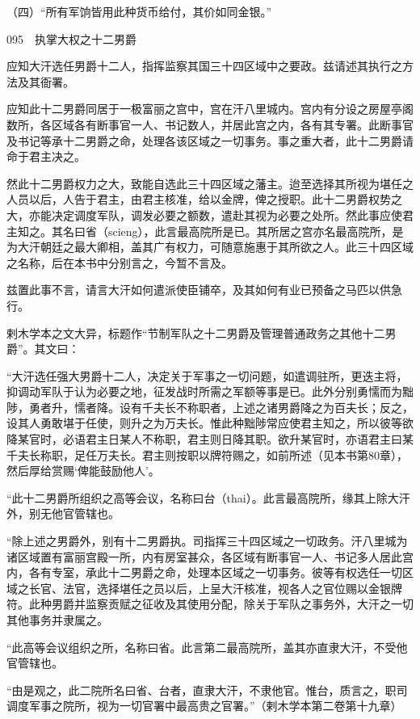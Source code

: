 \documentclass[12pt,UTF8]{ctexbook}
\begin{document}
（四）“所有军饷皆用此种货币给付，其价如同金银。”





095　执掌大权之十二男爵

应知大汗选任男爵十二人，指挥监察其国三十四区域中之要政。兹请述其执行之方法及其衙署。

应知此十二男爵同居于一极富丽之宫中，宫在汗八里城内。宫内有分设之房屋亭阁数所，各区域各有断事官一人、书记数人，并居此宫之内，各有其专署。此断事官及书记等承十二男爵之命，处理各该区域之一切事务。事之重大者，此十二男爵请命于君主决之。

然此十二男爵权力之大，致能自选此三十四区域之藩主。迨至选择其所视为堪任之人员以后，人告于君主，由君主核准，给以金牌，俾之授职。此十二男爵权势之大，亦能决定调度军队，调发必要之额数，遣赴其视为必要之处所。然此事应使君主知之。其名曰省（scieng），此言最高院所是已。其所居之宫亦名最高院所，是为大汗朝廷之最大卿相，盖其广有权力，可随意施惠于其所欲之人。此三十四区域之名称，后在本书中分别言之，今暂不言及。

兹置此事不言，请言大汗如何遣派使臣铺卒，及其如何有业已预备之马匹以供急行。

剌木学本之文大异，标题作“节制军队之十二男爵及管理普通政务之其他十二男爵”。其文曰：

“大汗选任强大男爵十二人，决定关于军事之一切问题，如遣调驻所，更迭主将，抑调动军队于认为必要之地，征发战时所需之军额等事是已。此外分别勇懦而为黜陟，勇者升，懦者降。设有千夫长不称职者，上述之诸男爵降之为百夫长；反之，设其人勇敢堪于任使，则升之为万夫长。惟此种黜陟常应使君主知之，所以彼等欲降某官时，必语君主日某人不称职，君主则日降其职。欲升某官时，亦语君主曰某千夫长称职，足任万夫长。君主则按职以牌符赐之，如前所述（见本书第80章），然后厚给赏赐‘俾能鼓励他人’。

“此十二男爵所组织之高等会议，名称曰台（thai）。此言最高院所，缘其上除大汗外，别无他官管辖也。

“除上述之男爵外，别有十二男爵执。司指挥三十四区域之一切政务。汗八里城为诸区域置有富丽宫殿一所，内有房室甚众，各区域有断事官一人、书记多人居此宫内，各有专室，承此十二男爵之命，处理本区域之一切事务。彼等有权选任一切区域之长官、法官，选择堪任之员以后，上呈大汗核准，视各人之官位赐以金银牌符。此种男爵并监察贡赋之征收及其使用分配，除关于军队之事务外，大汗之一切其他事务并隶属之。

“此高等会议组织之所，名称曰省。此言第二最高院所，盖其亦直隶大汗，不受他官管辖也。

“由是观之，此二院所名曰省、台者，直隶大汗，不隶他官。惟台，质言之，职司调度军事之院所，视为一切官署中最高贵之官署。”（剌木学本第二卷第十九章）
\end{document}
